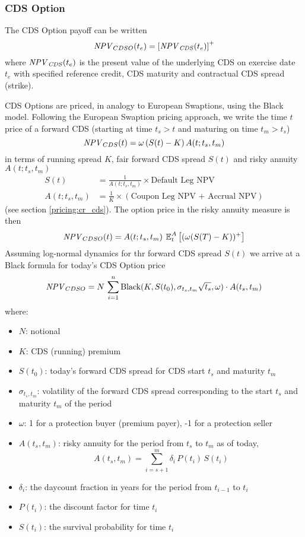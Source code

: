 \subsubsection{CDS Option}
\label{pricing:cr_cdsoption}

The CDS Option payoff can be written
$$
\mathit{NPV}_{CDSO}(t_e)=\left[ \mathit{NPV}_{\mathit{CDS}}(t_e) \right]^+
$$
where $\mathit{NPV}_{\mathit{CDS}}(t_e)$ is the present value of the underlying
CDS on exercise date $t_e$ with specified reference credit,  
CDS maturity and contractual CDS spread (strike).

\medskip
CDS Options are priced, in analogy to European Swaptions, using the
Black model. Following the European Swaption pricing approach, we
write the time $t$ price of a forward CDS (starting at time $t_s>t$
and maturing on time $t_m>t_s$)
$$
\mathit{NPV}_{CDS}(t) = \omega\,(S(t) - K)\,A(t;t_s,t_m)
$$ 
in terms of running spread $K$, fair forward CDS spread $S(t)$ and
risky annuity $A(t;t_s,t_m)$
\begin{align*}
S(t) &= \frac{1}{A(t;t_s,t_m)} \times \mbox{Default Leg NPV} \\
A(t;t_s,t_m) &=
\frac{1}{K}\times(\mbox{Coupon Leg NPV + Accrual NPV})
\end{align*}
(see section \ref{pricing:cr_cds}). The option price in the risky
annuity measure is then
$$
\mathit{NPV}_{CDSO}(t) = A(t;t_s,t_m) \:\operatorname{\mathbb{E}}^A_t\left[(\omega(S(T)-K))^+ \right]
$$
Assuming log-normal dynamics for thr forward CDS spread $S(t)$ we
arrive at a Black formula for today's CDS Option price
$$
\mathit{NPV}_{CDSO} = N \,\sum_{i=1}^n \mbox{Black}(K, S(t_0), \sigma_{t_s,t_m} \sqrt{t_s},\omega)\cdot A(t_s, t_m)
$$
where:
\begin{itemize}
\item $N$: notional
\item $K$: CDS (running) premium 
\item $S(t_0)$: today's forward CDS spread for CDS start $t_s$
  and maturity $t_m$ 
\item $\sigma_{t_s,t_m}$: volatility of the forward CDS spread corresponding 
to the start $t_s$ and maturity $t_m$ of the period
\item $\omega$: 1 for a protection buyer (premium payer), -1 for a
  protection seller
\item $A(t_s,t_m)$: risky annuity for the period from $t_s$ to $t_m$
  as of today, 
$$
A(t_s, t_m)= \sum_{i=s+1}^m \delta_i\,P(t_i) \,S(t_i)
$$
\item $\delta_i$: the daycount fraction in years for the period from $t_{i-1}$ to $t_i$
\item $P(t_i)$: the discount factor for time $t_i$
\item $S(t_i)$: the survival probability for time $t_i$
\end{itemize}

